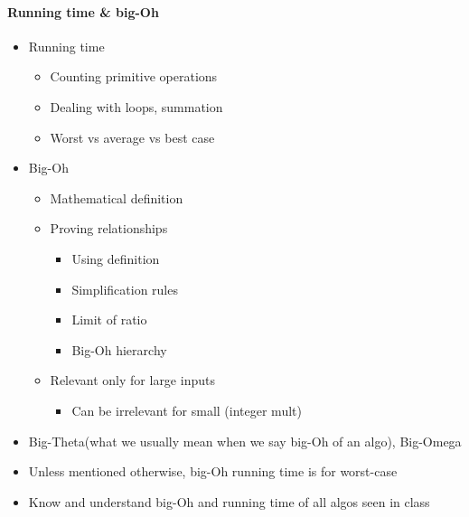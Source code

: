\documentclass[12 pt]{article}
\theoremstyle{definition}
\begin{document}
\paragraph{Running time \& big-Oh}
\begin{itemize}
\item Running time
  \begin{itemize}
  \item Counting primitive operations
  \item Dealing with loops, summation
  \item Worst vs average vs best case
  \end{itemize}
\item Big-Oh
  \begin{itemize}
  \item Mathematical definition
  \item Proving relationships
    \begin{itemize}
    \item Using definition
    \item Simplification rules
    \item Limit of ratio
      \item Big-Oh hierarchy
      \end{itemize}
    \item Relevant only for large inputs
      \begin{itemize}
      \item Can be irrelevant for small (integer mult)
      \end{itemize}
    \end{itemize}
  \item Big-Theta(what we usually mean when we say big-Oh of an algo), Big-Omega
  \item Unless mentioned otherwise, big-Oh running time is for worst-case
    \item Know and understand big-Oh and running time of all algos seen in class
\end{itemize}
\end{document}
